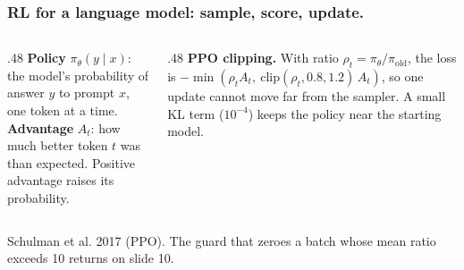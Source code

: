 \documentclass[aspectratio=169,11pt]{beamer}
\newcommand{\source}[1]{\vfill{\scriptsize\color{Gray}#1\par}}
\begin{document}
\begin{frame}[t]
\frametitle{RL for a language model: sample, score, update.}
\begin{center}
\end{center}
\begin{columns}[T,onlytextwidth]
\begin{column}{.48\textwidth}
\textbf{Policy} $\pi_\theta(y\mid x)$: the model's probability of answer $y$ to prompt $x$,
one token at a time.\\[1mm]
\textbf{Advantage} $A_t$: how much better token $t$ was than expected. Positive advantage
raises its probability.
\end{column}
\begin{column}{.48\textwidth}
\textbf{PPO clipping.} With ratio $\rho_t=\pi_\theta/\pi_{\text{old}}$, the loss is
$-\min(\rho_t A_t,\ \mathrm{clip}(\rho_t,0.8,1.2)\,A_t)$, so one update cannot move far
from the sampler. A small KL term ($10^{-4}$) keeps the policy near the starting model.
\end{column}
\end{columns}
\source{Schulman et al. 2017 (PPO). The guard that zeroes a batch whose mean ratio exceeds 10 returns on slide 10.}
\end{frame}
\end{document}
